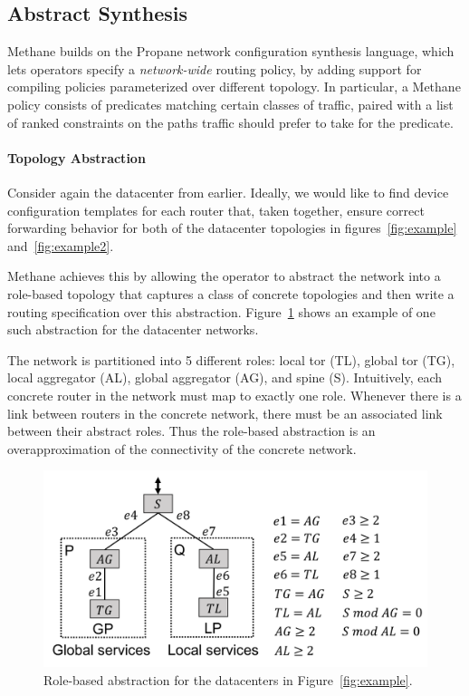 \documentclass{sig-alternate-10pt}
\newcommand{\sysname}{{\small \sf Methane}\xspace}
\newcommand{\para}[1]{\paragraph*{\textbf{#1}}}
\begin{document}
\subsection{Abstract Synthesis}

\sysname builds on the Propane network configuration synthesis language,
which lets operators specify a \emph{network-wide} routing policy, by adding
support for compiling policies parameterized over different topology.
In particular, a \sysname policy consists of predicates matching
certain classes of traffic, paired with a list of ranked constraints
on the paths traffic should prefer to take for the predicate.

\para{Topology Abstraction}

Consider again the datacenter from earlier. Ideally, we would like
to find device configuration templates for each router that, taken together, ensure correct forwarding
behavior for both of the datacenter topologies in figures~\ref{fig:example} and~\ref{fig:example2}.

\sysname achieves this by allowing the operator to abstract the network into
a role-based topology that captures a class of concrete topologies and then write a
routing specification over this abstraction. Figure~\ref{fig:example3} shows an example of one
such abstraction for the datacenter networks.

The network is partitioned into 5 different roles:
local tor (TL), global tor (TG), local aggregator (AL), global aggregator (AG), and spine (S).
Intuitively, each concrete router in the network must map to exactly one role.
Whenever there is a link between routers in the concrete network, there must be an associated link
between their abstract roles. Thus the role-based abstraction is an overapproximation of the connectivity
of the concrete network.

\begin{figure}[t!]
  \centering
  \includegraphics[width=\columnwidth]{figures/example3}
  \caption{Role-based abstraction for the datacenters in Figure~\ref{fig:example}.}
  \label{fig:example3}
  \vspace{-1em}
\end{figure}
\end{document}
